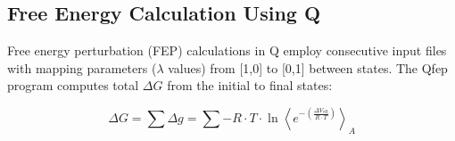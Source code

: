 \documentclass[journal=jacsat,manuscript=article]{achemso}
\begin{document}
\subsection{Free Energy Calculation Using Q}

Free energy perturbation (FEP) calculations in Q employ consecutive input files with mapping parameters ($\lambda$ values) from [1,0] to [0,1] between states. The Qfep program computes total $\Delta G$ from the initial to final states:

\begin{equation}
    \Delta G = \sum \Delta g = \sum -R \cdot T \cdot \ln \left\langle e^{-\left(\frac{\Delta V_{\text{eff}}}{R \cdot T}\right)} \right\rangle_{A}
\end{equation}
\end{document}
